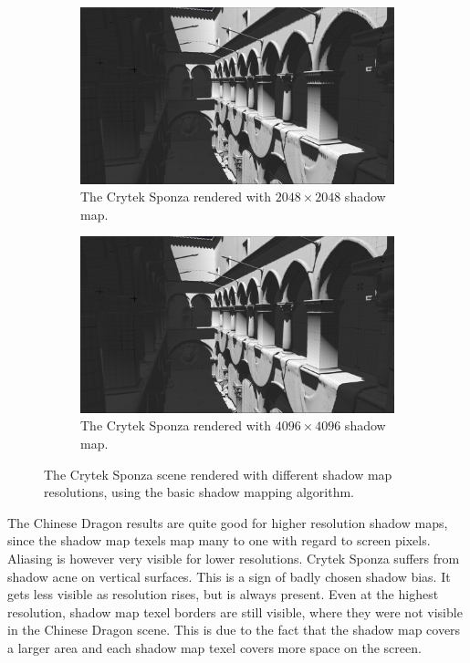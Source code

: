 \begin{figure}
    \begin{subfigure}{0.48\textwidth}
		\centering
        \includegraphics[width=\textwidth]{./graf/tests/basic/cropped/sponza_basic_fhd_2048.png}
        \caption{The Crytek Sponza rendered with \(2048\times 2048\) shadow map.}
    \end{subfigure}
	\hfill
    \begin{subfigure}{0.48\textwidth}
		\centering
        \includegraphics[width=\textwidth]{./graf/tests/basic/cropped/sponza_basic_fhd_4096.png}
        \caption{The Crytek Sponza rendered with \(4096\times 4096\) shadow map.}
    \end{subfigure}

    \caption{The Crytek Sponza scene rendered with different shadow map resolutions, using the basic shadow mapping algorithm.}
    \label{fig:test_basic_sponza_screens}
\end{figure}

The Chinese Dragon results are quite good for higher resolution shadow maps, since the shadow map texels map many to one with regard to screen pixels. Aliasing is however very visible for lower resolutions. Crytek Sponza suffers from shadow acne on vertical surfaces. This is a sign of badly chosen shadow bias. It gets less visible as resolution rises, but is always present. Even at the highest resolution, shadow map texel borders are still visible, where they were not visible in the Chinese Dragon scene. This is due to the fact that the shadow map covers a larger area and each shadow map texel covers more space on the screen.

